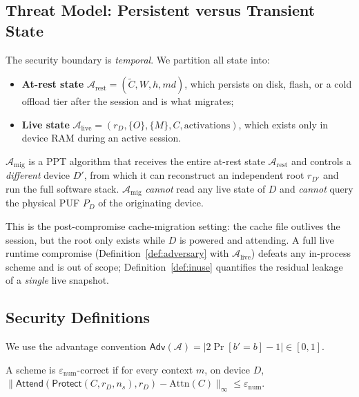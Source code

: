 \subsection{Threat Model: Persistent versus Transient State}
\label{sec:theory-threat}

The security boundary is \emph{temporal}. We partition all state into:
\begin{itemize}
  \item \textbf{At-rest state} $\mathcal{A}_{\mathrm{rest}}=(\tilde C, W, h, \mathit{md})$,
        which persists on disk, flash, or a cold offload tier after the session and
        is what migrates;
  \item \textbf{Live state} $\mathcal{A}_{\mathrm{live}}=(r_D,\{O\},\{M\}, C, \text{activations})$,
        which exists only in device RAM during an active session.
\end{itemize}

\begin{definition}
\label{def:adversary}
$\mathcal{A}_{\mathrm{mig}}$ is a PPT algorithm that receives the entire at-rest
state $\mathcal{A}_{\mathrm{rest}}$ and controls a \emph{different} device $D'$,
from which it can reconstruct an independent root $r_{D'}$ and run the full
software stack. $\mathcal{A}_{\mathrm{mig}}$ \emph{cannot} read any live state of
$D$ and \emph{cannot} query the physical PUF $P_D$ of the originating device.
\end{definition}

This is the post-compromise cache-migration setting: the cache file outlives the
session, but the root only exists while $D$ is powered and attending. A full live
runtime compromise (Definition~\ref{def:adversary} with $\mathcal{A}_{\mathrm{live}}$)
defeats any in-process scheme and is out of scope; Definition~\ref{def:inuse}
quantifies the residual leakage of a \emph{single} live snapshot.

\subsection{Security Definitions}
\label{sec:theory-defs}

We use the advantage convention $\mathsf{Adv}(\mathcal{A})=\lvert 2\Pr[b'=b]-1\rvert\in[0,1]$.

\begin{definition}[Correctness]
\label{def:correct}
A scheme is $\varepsilon_{\mathrm{num}}$-correct if for every context $m$,
on device $D$,
$\lVert \mathsf{Attend}(\mathsf{Protect}(C,r_D,n_s),r_D)-\mathrm{Attn}(C)\rVert_\infty
\le \varepsilon_{\mathrm{num}}$.
\end{definition}

